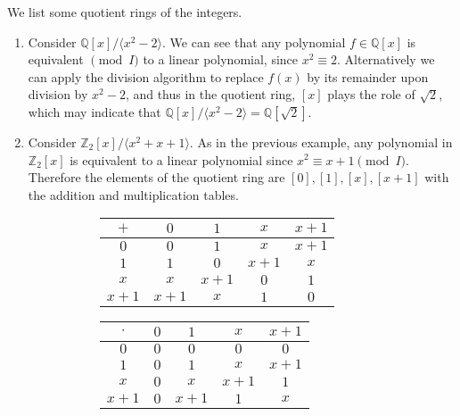     \begin{example}
      We list some quotient rings of the integers.  
      \begin{enumerate}
        \item Consider $\mathbb{Q}[x] / \langle x^2 - 2 \rangle$. We can see that any polynomial $f \in \mathbb{Q}[x]$ is equivalent $\pmod{I}$ to a linear polynomial, since $x^2 \equiv 2$. Alternatively we can apply the division algorithm to replace $f(x)$ by its remainder upon division by $x^2 - 2$, and thus in the quotient ring, $[x]$ plays the role of $\sqrt{2}$, which may indicate that $\mathbb{Q}[x] / \langle x^2 - 2 \rangle = \mathbb{Q}[\sqrt{2}]$. 
        \item Consider $\mathbb{Z}_2 [x]/ \langle x^2 + x + 1 \rangle$. As in the previous example, any polynomial in $\mathbb{Z}_2[x]$ is equivalent to a linear polynomial since $x^2 \equiv x + 1 \pmod{I}$. Therefore the elements of the quotient ring are $[0], [1], [x], [x+1]$ with the addition and multiplication tables. 

        \begin{figure}[H]
          \centering
          \begin{subfigure}[b]{0.48\textwidth}
            \centering
            \begin{tabular}{c|cccc}
              $+$ & $0$ & $1$ & $x$ & $x + 1$ \\
              \hline
              $0$ & $0$ & $1$ & $x$ & $x + 1$ \\
              $1$ & $1$ & $0$ & $x + 1$ & $x$ \\
              $x$ & $x$ & $x + 1$ & $0$ & $1$ \\
              $x + 1$ & $x + 1$ & $x$ & $1$ & $0$ \\
            \end{tabular}
            \caption{}
          \end{subfigure}
          \hfill 
          \begin{subfigure}[b]{0.48\textwidth}
            \centering
            \begin{tabular}{c|cccc}
              $\cdot$ & $0$ & $1$ & $x$ & $x + 1$ \\
              \hline
              $0$ & $0$ & $0$ & $0$ & $0$ \\
              $1$ & $0$ & $1$ & $x$ & $x + 1$ \\
              $x$ & $0$ & $x$ & $x + 1$ & $1$ \\
              $x + 1$ & $0$ & $x + 1$ & $1$ & $x$ \\
            \end{tabular}
            \caption{}
          \end{subfigure}
          \label{fig:boolean-algebra-tables}
        \end{figure}
      \end{enumerate}
    \end{example}

